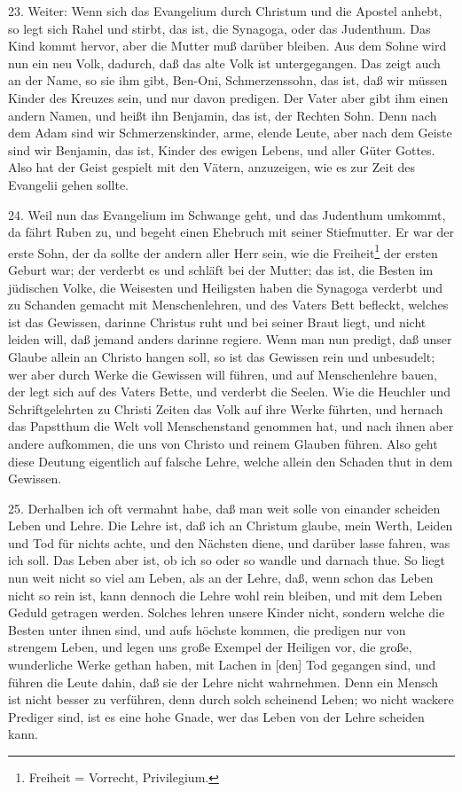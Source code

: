 23. Weiter: Wenn sich das Evangelium durch Christum und die Apostel anhebt, so legt sich Rahel und stirbt, das ist, die Synagoga, oder das Judenthum. Das Kind kommt hervor, aber die Mutter muß darüber bleiben. Aus dem Sohne wird nun ein neu Volk, dadurch, daß das alte Volk ist untergegangen. Das zeigt auch an der Name, so sie ihm gibt, Ben-Oni, Schmerzenssohn, das ist, daß wir müssen Kinder des Kreuzes sein, und nur davon predigen. Der Vater aber gibt ihm einen andern Namen, und heißt ihn Benjamin, das ist, der Rechten Sohn. Denn nach dem Adam sind wir Schmerzenskinder, arme, elende Leute, aber nach dem Geiste sind wir Benjamin, das ist, Kinder des ewigen Lebens, und aller Güter Gottes. Also hat der Geist gespielt mit den Vätern, anzuzeigen, wie es zur Zeit des Evangelii gehen sollte.

24. Weil nun das Evangelium im Schwange geht, und das Judenthum umkommt, da fährt Ruben zu, und begeht einen Ehebruch mit seiner Stiefmutter. Er war der erste Sohn, der da sollte der andern aller Herr sein, wie die Freiheit\footnote{Freiheit = Vorrecht, Privilegium.} der ersten Geburt war; der verderbt es und schläft bei der Mutter; das ist, die Besten im jüdischen Volke, die Weisesten und Heiligsten haben die Synagoga verderbt und zu Schanden gemacht mit Menschenlehren, und des Vaters Bett befleckt, welches ist das Gewissen, darinne Christus ruht und bei seiner Braut liegt, und nicht leiden will, daß jemand anders darinne regiere. Wenn man nun predigt, daß unser Glaube allein an Christo hangen soll, so ist das Gewissen rein und unbesudelt; wer aber durch Werke die Gewissen will führen, und auf Menschenlehre bauen, der legt sich auf des Vaters Bette, und verderbt die Seelen. Wie die Heuchler und Schriftgelehrten zu Christi Zeiten das Volk auf ihre Werke führten, und hernach das Papstthum die Welt voll Menschenstand genommen hat, und nach ihnen aber andere aufkommen, die uns von Christo und reinem Glauben führen. Also geht diese Deutung eigentlich auf falsche Lehre, welche allein den Schaden thut in dem Gewissen.

25. Derhalben ich oft vermahnt habe, daß man weit solle von einander scheiden Leben und
Lehre. Die Lehre ist, daß ich an Christum glaube, mein Werth, Leiden und Tod für nichts achte, und den Nächsten diene, und darüber lasse fahren, was ich soll. Das Leben aber ist, ob ich so oder so wandle und darnach thue. So liegt nun weit nicht so viel am Leben, als an der Lehre, daß, wenn schon das Leben nicht so rein ist, kann dennoch die Lehre wohl rein bleiben, und mit dem Leben Geduld getragen werden. Solches lehren unsere Kinder nicht, sondern welche die Besten unter ihnen sind, und aufs höchste kommen, die predigen nur von strengem Leben, und legen uns große Exempel der Heiligen vor, die große, wunderliche Werke gethan haben, mit Lachen in [den] Tod gegangen sind, und führen die Leute dahin, daß sie der Lehre nicht wahrnehmen. Denn ein Mensch ist nicht besser zu verführen, denn durch solch scheinend Leben; wo nicht wackere Prediger sind, ist es eine hohe Gnade, wer das Leben von der Lehre scheiden kann.

